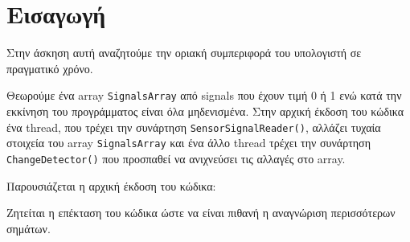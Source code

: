 \chapter{Εισαγωγή}

Στην άσκηση αυτή αναζητούμε την οριακή συμπεριφορά του υπολογιστή σε πραγματικό 
χρόνο.

Θεωρούμε ένα array \lstinline!SignalsArray! από signals που έχουν τιμή 0 
ή 1 ενώ κατά την εκκίνηση του προγράμματος είναι όλα μηδενισμένα. Στην αρχική 
έκδοση του 
κώδικα ένα thread, που τρέχει την συνάρτηση \lstinline!SensorSignalReader()!, 
αλλάζει τυχαία στοιχεία του array 
\lstinline!SignalsArray! και ένα άλλο thread τρέχει την συνάρτηση 
\lstinline!ChangeDetector()! που προσπαθεί να ανιχνεύσει τις αλλαγές στο array.

Παρουσιάζεται η αρχική έκδοση του κώδικα:



Ζητείται η επέκταση του κώδικα ώστε να είναι πιθανή η αναγνώριση περισσότερων 
σημάτων.
